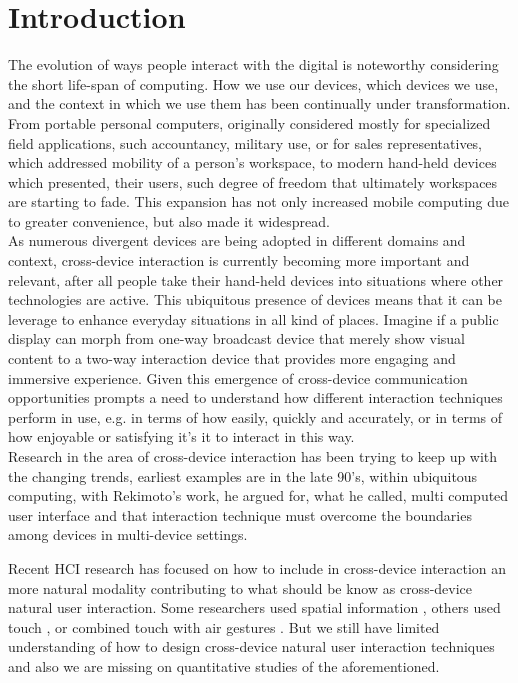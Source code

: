 \section{Introduction} \label{sec:introduction}
The evolution of ways people interact with the digital is noteworthy considering the short life-span of computing. How we use our devices, which devices we use, and the context in which we use them has been continually under transformation. From portable personal computers, originally considered mostly for specialized field applications, such accountancy, military use, or for sales representatives, which addressed mobility of a person's workspace, to modern hand-held devices which presented, their users, such degree of freedom that ultimately workspaces are starting to fade. This expansion has not only increased mobile computing due to greater convenience, but also made it widespread.\cite{Francis:1997} \\

As numerous divergent devices are being adopted in different domains and context, cross-device interaction is currently becoming more important and relevant, after all people take their hand-held devices into situations where other technologies are active. This ubiquitous presence of devices means that it can be leverage to enhance everyday situations in all kind of places. Imagine if a public display can morph from one-way broadcast device that merely show visual content to a two-way interaction device that provides more engaging and immersive experience. Given this emergence of cross-device communication opportunities prompts a need to understand how different interaction techniques perform in use, e.g. in terms of how easily, quickly and accurately, or in terms of how enjoyable or satisfying it's it to interact in this way. \\

Research in the area of cross-device interaction has been trying to keep up with the changing trends, earliest examples are in the late 90's, within ubiquitous computing, with Rekimoto's work,  he argued for, what he called, multi computed user interface and that interaction technique must overcome the boundaries among devices in multi-device settings\cite{Rekimoto:1998}.

Recent HCI research has focused on how to include in cross-device interaction an more natural modality contributing to what should be know as cross-device natural user interaction.  Some researchers used spatial information \cite{Marquardt:2011, Marquardt:2012}, others used touch \cite{Seifert:2012}, or combined touch with air gestures \cite{Bragdon:2011} . But we still have limited understanding of how to design cross-device natural user interaction techniques and also we are missing on quantitative studies of the aforementioned.\\

